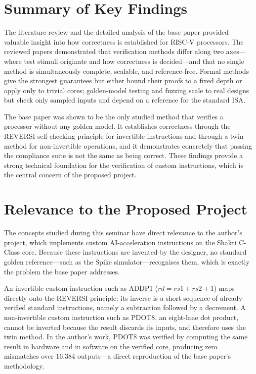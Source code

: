 \documentclass[12pt,a4paper]{report}
\begin{document}
\section{Summary of Key Findings}
The literature review and the detailed analysis of the base paper provided valuable insight
into how correctness is established for RISC-V processors. The reviewed papers demonstrated
that verification methods differ along two axes---where test stimuli originate and how
correctness is decided---and that no single method is simultaneously complete, scalable, and
reference-free. Formal methods give the strongest guarantees but either bound their proofs
to a fixed depth or apply only to trivial cores; golden-model testing and fuzzing scale to
real designs but check only sampled inputs and depend on a reference for the standard ISA.

The base paper was shown to be the only studied method that verifies a processor without any
golden model. It establishes correctness through the REVERSI self-checking principle for
invertible instructions and through a twin method for non-invertible operations, and it
demonstrates concretely that passing the compliance suite is not the same as being correct.
These findings provide a strong technical foundation for the verification of custom
instructions, which is the central concern of the proposed project.

\section{Relevance to the Proposed Project}
The concepts studied during this seminar have direct relevance to the author's project,
which implements custom AI-acceleration instructions on the Shakti C-Class core. Because
these instructions are invented by the designer, no standard golden reference---such as the
Spike simulator---recognises them, which is exactly the problem the base paper addresses.

An invertible custom instruction such as ADDP1 ($rd = rs1 + rs2 + 1$) maps directly onto the
REVERSI principle: its inverse is a short sequence of already-verified standard
instructions, namely a subtraction followed by a decrement. A non-invertible custom
instruction such as PDOT8, an eight-lane dot product, cannot be inverted because the result
discards its inputs, and therefore uses the twin method. In the author's work, PDOT8 was
verified by computing the same result in hardware and in software on the verified core,
producing zero mismatches over 16{,}384 outputs---a direct reproduction of the base paper's
methodology.
\end{document}
